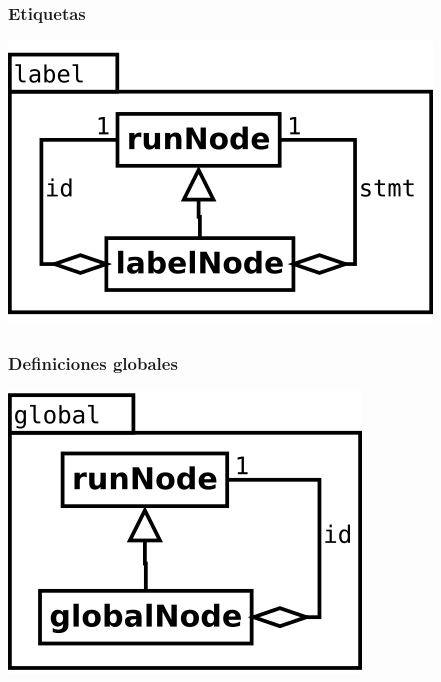 \subsubsection {Etiquetas}
\begin{center}
\includegraphics[scale=0.4]{label.png} \\
\end{center}

\subsubsection {Definiciones globales}
\begin{center}
\includegraphics[scale=0.4]{global.png} \\
\end{center}

